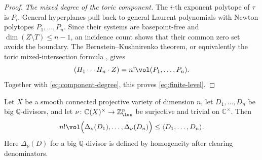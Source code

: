 \documentclass[11pt,a4paper]{amsart}
\begin{document}
\begin{proof}
\smallskip
\noindent\emph{The mixed degree of the toric component.}
The $i$-th exponent polytope of $\tau$ is $P_i$.  General hyperplanes pull
back to general Laurent polynomials with Newton polytopes
$P_1,\ldots,P_n$.  Since their systems are basepoint-free and
$\dim(Z\setminus T)\leq n-1$, an incidence count shows that their common
zero set avoids the boundary.  The Bernstein--Kushnirenko theorem, or
equivalently the toric mixed-intersection formula \cite{Ber75,Ful93}, gives
\[
 (H_1\cdots H_n\cdot Z)=n!\vol(P_1,\ldots,P_n).
\]
Together with \eqref{eq:component-degree}, this proves
\eqref{eq:finite-level}.
\end{proof}

\begin{proposition}\label{prop:movable-upper}
Let $X$ be a smooth connected projective variety of dimension $n$, let $D_1,\ldots,D_n$ be big $\mathbb Q$-divisors, and let
$\nu\colon\mathbb C(X)^\times\to\mathbb Z^n_{\lex}$ be surjective and trivial on $\mathbb C^\times$. Then
\[
 n!\vol\Bigl(\Delta_\nu(D_1),\ldots,\Delta_\nu(D_n)\Bigr)\leq\langle D_1,\ldots,D_n\rangle.
\]
Here $\Delta_\nu(D)$ for a big $\mathbb Q$-divisor is defined by homogeneity after clearing denominators.
\end{proposition}
\end{document}
